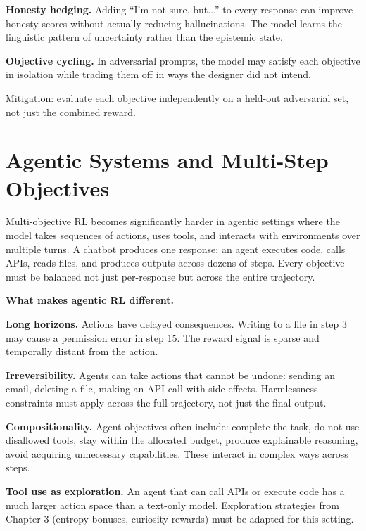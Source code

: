 \begin{chapterenv}
\begin{tipbox}
\textbf{Honesty hedging.} Adding ``I'm not sure, but...'' to every response can improve honesty scores without actually reducing hallucinations. The model learns the linguistic pattern of uncertainty rather than the epistemic state.

\textbf{Objective cycling.} In adversarial prompts, the model may satisfy each objective in isolation while trading them off in ways the designer did not intend.

Mitigation: evaluate each objective independently on a held-out adversarial set, not just the combined reward.
\end{tipbox}

\section{Agentic Systems and Multi-Step Objectives}

Multi-objective RL becomes significantly harder in agentic settings where the model takes sequences of actions, uses tools, and interacts with environments over multiple turns. A chatbot produces one response; an agent executes code, calls APIs, reads files, and produces outputs across dozens of steps. Every objective must be balanced not just per-response but across the entire trajectory.

\begin{infobox}
\textbf{What makes agentic RL different.}

\textbf{Long horizons.} Actions have delayed consequences. Writing to a file in step 3 may cause a permission error in step 15. The reward signal is sparse and temporally distant from the action.

\textbf{Irreversibility.} Agents can take actions that cannot be undone: sending an email, deleting a file, making an API call with side effects. Harmlessness constraints must apply across the full trajectory, not just the final output.

\textbf{Compositionality.} Agent objectives often include: complete the task, do not use disallowed tools, stay within the allocated budget, produce explainable reasoning, avoid acquiring unnecessary capabilities. These interact in complex ways across steps.

\textbf{Tool use as exploration.} An agent that can call APIs or execute code has a much larger action space than a text-only model. Exploration strategies from Chapter 3 (entropy bonuses, curiosity rewards) must be adapted for this setting.
\end{infobox}


\end{chapterenv}
